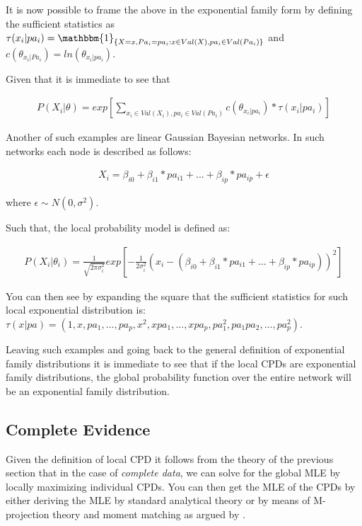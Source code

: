 \documentclass[11pt]{article}
\begin{document}
\begin{article}
It is now possible to frame the above in the exponential family form by
defining the sufficient statistics as \(\tau(x_i | pa_i) =
  \mathbbm{1}_{\{X = x, Pa_i = pa_i : x \in Val(X), pa_i \in
  Val(Pa_i)\}}\) and \(c(\theta_{x_i | Pa_i}) = ln(\theta_{x_i |
  pa_i})\).

Given that it is immediate to see that

\begin{align} \label{eq:multinomial-cpd}
P(X_i|\theta) = exp[\sum_{x_i \in Val(X_i), pa_i \in Val(Pa_i)} c(\theta_{x_i | pa_i}) * \tau(x_i | pa_i)] 
\end{align}

Another of such examples are linear Gaussian Bayesian networks. In
such networks each node is described as follows:

\begin{align} \label{eq:local-prob-model}
X_i = \beta_{i0} + \beta_{i1} * pa_{i1} + ... + \beta_{ip} * pa_{ip} + \epsilon
\end{align}

where \(\epsilon \sim N(0,\sigma^2)\).

Such that, the local probability model is defined as:

\begin{align} \label{eq:gaussian-cpd}
P(X_i|\theta_i) = \frac{1}{\sqrt{2\pi\sigma_i^2}} exp[-\frac{1}{2\sigma_i^2} (x_i - (\beta_{i0} + \beta_{i1} * pa_{i1} + ... + \beta_{ip} * pa_{ip}))^2] 
\end{align}

You can then see by expanding the square that the sufficient
statistics for such local exponential distribution is: \(\tau(x|pa) =
  (1,x,pa_1, ..., pa_p, x^2, xpa_1, . . . , xpa_p, pa_1^2, pa_1pa_2,
  . . . , pa_p^2)\).

Leaving such examples and going back to the general definition of
exponential family distributions it is immediate to see that if
the local CPDs are exponential family distributions, the global
probability function over the entire network will be an
exponential family distribution.

\subsection{Complete Evidence}
\label{sec:org8f9d041}

Given the definition of local CPD it follows from the theory of the
previous section that in the case of \emph{complete data}, we can solve
for the global MLE by locally maximizing individual CPDs. You can
then get the MLE of the CPDs by either deriving the MLE by standard
analytical theory or by means of M-projection theory and moment
matching as argued by \cite{koller2009probabilistic}.


\end{article}
\end{document}

